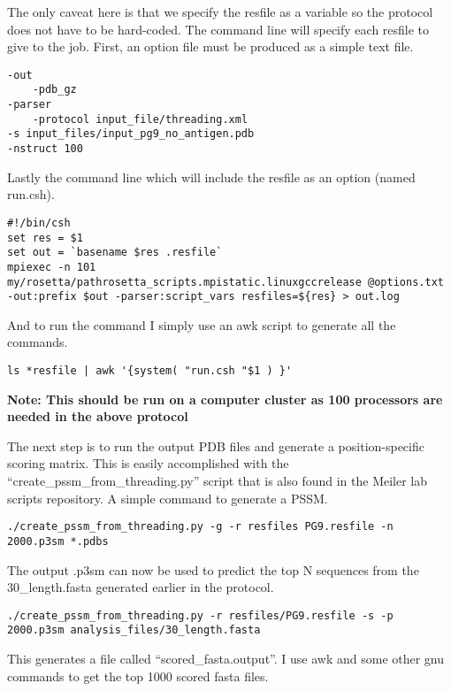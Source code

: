 The only caveat here is that we specify the resfile as a variable so the protocol does not have to be hard-coded. The command line will specify each resfile to give to the job. First, an option file must be produced as a simple text file.


\begin{lstlisting}[breaklines=true]
-out
    -pdb_gz
-parser
    -protocol input_file/threading.xml
-s input_files/input_pg9_no_antigen.pdb
-nstruct 100
\end{lstlisting}

Lastly the command line which will include the resfile as an option (named run.csh).

\begin{lstlisting}[breaklines=true]
#!/bin/csh
set res = $1
set out = `basename $res .resfile`
mpiexec -n 101 my/rosetta/pathrosetta_scripts.mpistatic.linuxgccrelease @options.txt -out:prefix $out -parser:script_vars resfiles=${res} > out.log
\end{lstlisting}

And to run the command I simply use an awk script to generate all the commands.

\begin{lstlisting}[breaklines=true]
ls *resfile | awk '{system( "run.csh "$1 ) }'
\end{lstlisting}

\textbf{Note: This should be run on a computer cluster as 100 processors are needed in the above protocol}

The next step is to run the output PDB files and generate a position-specific scoring matrix. This is easily accomplished with the ``create\_pssm\_from\_threading.py'' script that is also found in the Meiler lab scripts repository. A simple command to generate a PSSM.

\begin{lstlisting}[breaklines=true]
./create_pssm_from_threading.py -g -r resfiles PG9.resfile -n 2000.p3sm *.pdbs
\end{lstlisting}

The output .p3sm can now be used to predict the top N sequences from the 30\_length.fasta generated earlier in the protocol.

\begin{lstlisting}[breaklines=true]
./create_pssm_from_threading.py -r resfiles/PG9.resfile -s -p 2000.p3sm analysis_files/30_length.fasta
\end{lstlisting}

This generates a file called ``scored\_fasta.output''. I use awk and some other gnu commands to get the top 1000 scored fasta files.

